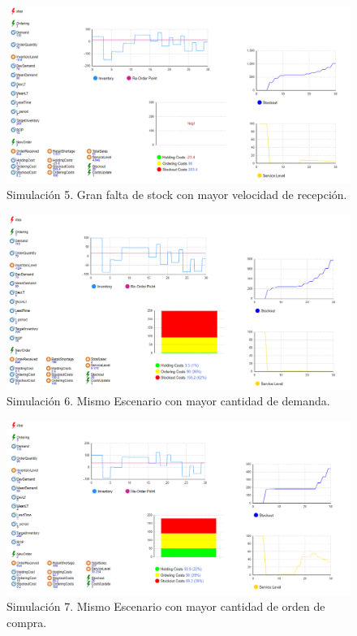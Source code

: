 \begin{figure}[H]
    \includegraphics[width=\linewidth]{images/img5invent}
    \caption{Simulación 5. Gran falta de stock con mayor velocidad de recepción.}
\end{figure}

\begin{figure}[H]
    \includegraphics[width=\linewidth]{images/img6invent}
    \caption{Simulación 6. Mismo Escenario con mayor cantidad de demanda.}
\end{figure}

\begin{figure}[H]
    \includegraphics[width=\linewidth]{images/img7invent}
    \caption{Simulación 7. Mismo Escenario con mayor cantidad de orden de compra.}
\end{figure}

